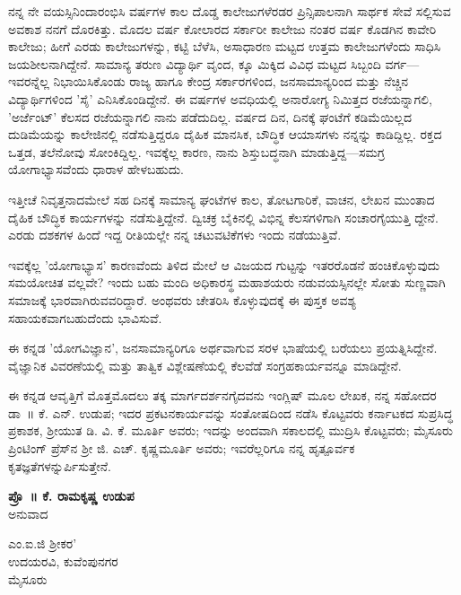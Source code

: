 ನನ್ನ  ನೇ ವಯಸ್ಸಿನಿಂದಾರಂಭಿಸಿ  ವರ್ಷಗಳ ಕಾಲ ದೊಡ್ಡ ಕಾಲೇಜುಗಳೆರಡರ ಪ್ರಿನ್ಸಿಪಾಲನಾಗಿ ಸಾರ್ಥಕ ಸೇವೆ ಸಲ್ಲಿಸುವ ಅವಕಾಶ ನನಗೆ ದೊರಕಿತ್ತು. ಮೊದಲ  ವರ್ಷ ಕೋಲಾರದ ಸರ್ಕಾರೀ ಕಾಲೇಜು ನಂತರ  ವರ್ಷ ಕೊಡಗಿನ ಕಾವೇರಿ ಕಾಲೇಜು; ಹೀಗೆ ಎರಡು ಕಾಲೇಜುಗಳನ್ನು, ಕಟ್ಟಿ ಬೆಳೆಸಿ, ಅಸಾಧಾರಣ ಮಟ್ಟದ ಉತ್ತಮ ಕಾಲೇಜುಗಳೆಂದು ಸಾಧಿಸಿ ಜಯಶೀಲನಾಗಿದ್ದೇನೆ. ಸಾಮಾನ್ಯ  ತರುಣ ವಿದ್ಯಾರ್ಥಿ ವೃಂದ,  ಕ್ಕೂ ಮಿಕ್ಕಿದ ವಿವಿಧ ಮಟ್ಟದ ಸಿಬ್ಬಂದಿ ವರ್ಗ—ಇವರನ್ನೆಲ್ಲ ನಿಭಾಯಿಸಿಕೊಂಡು ರಾಜ್ಯ ಹಾಗೂ ಕೇಂದ್ರ ಸರ್ಕಾರಗಳಿಂದ, ಜನಸಾಮಾನ್ಯರಿಂದ ಮತ್ತು ನೆಚ್ಚಿನ ವಿದ್ಯಾರ್ಥಿಗಳಿಂದ 'ಸೈ' ಎನಿಸಿಕೊಂಡಿದ್ದೇನೆ. ಈ  ವರ್ಷಗಳ ಅವಧಿಯಲ್ಲಿ ಅನಾರೋಗ್ಯ ನಿಮಿತ್ತದ ರಜೆಯನ್ನಾಗಲಿ, 'ಅರ್ಜೆಂಟ್​' ಕೆಲಸದ ರಜೆಯನ್ನಾಗಲಿ ನಾನು ಪಡೆದುದಿಲ್ಲ. ವರ್ಷದ  ದಿನ, ದಿನಕ್ಕೆ  ಘಂಟೆಗೆ ಕಡಿಮೆಯಿಲ್ಲದ ದುಡಿಮೆಯನ್ನು ಕಾಲೇಜಿನಲ್ಲಿ ನಡೆಸುತ್ತಿದ್ದರೂ ದೈಹಿಕ ಮಾನಸಿಕ, ಬೌದ್ಧಿಕ ಆಯಾಸಗಳು ನನ್ನನ್ನು ಕಾಡಿದ್ದಿಲ್ಲ. ರಕ್ತದ ಒತ್ತಡ, ತಲೆನೋವು ಸೋಂಕಿದ್ದಿಲ್ಲ. ಇವಕ್ಕೆಲ್ಲ ಕಾರಣ, ನಾನು ಶಿಸ್ತುಬದ್ಧನಾಗಿ ಮಾಡುತ್ತಿದ್ದ—ಸಮಗ್ರ ಯೋಗಾಭ್ಯಾಸವೆಂದು ಧಾರಾಳ ಹೇಳಬಹುದು.

ಇತ್ತೀಚೆ ನಿವೃತ್ತನಾದಮೇಲೆ ಸಹ ದಿನಕ್ಕೆ ಸಾಮಾನ್ಯ  ಘಂಟೆಗಳ ಕಾಲ, ತೋಟಗಾರಿಕೆ, ವಾಚನ, ಲೇಖನ ಮುಂತಾದ ದೈಹಿಕ ಬೌದ್ಧಿಕ ಕಾರ್ಯಗಳನ್ನು ನಡೆಸುತ್ತಿದ್ದೇನೆ. ದ್ವಿಚಕ್ರ ಬೈಕಿನಲ್ಲಿ ವಿಭಿನ್ನ ಕೆಲಸಗಳಿಗಾಗಿ ಸಂಚಾರಗೈಯುತ್ತಿ ದ್ದೇನೆ. ಎರಡು ದಶಕಗಳ ಹಿಂದೆ ಇದ್ದ ರೀತಿಯಲ್ಲೇ ನನ್ನ ಚಟುವಟಿಕೆಗಳು ಇಂದು ನಡೆಯುತ್ತಿವೆ.

ಇವಕ್ಕೆಲ್ಲ 'ಯೋಗಾಭ್ಯಾಸ' ಕಾರಣವೆಂದು ತಿಳಿದ ಮೇಲೆ ಆ ವಿಜಯದ ಗುಟ್ಟನ್ನು  ಇತರರೊಡನೆ ಹಂಚಿಕೊಳ್ಳುವುದು ಸಮಯೋಚಿತ ವಲ್ಲವೇ? ಇಂದು ಬಹು ಮಂದಿ ಅಧಿಕಾರಸ್ಥ ಮಹಾಶಯರು ನಡುವಯಸ್ಸಿನಲ್ಲೇ ಸೋತು ಸುಣ್ಣವಾಗಿ ಸಮಾಜಕ್ಕೆ ಭಾರವಾಗಿರುವವರಿದ್ದಾರೆ. ಅಂಥವರು ಚೇತರಿಸಿ ಕೊಳ್ಳುವುದಕ್ಕೆ ಈ ಪುಸ್ತಕ ಅವಶ್ಯ ಸಹಾಯಕವಾಗಬಹುದೆಂದು ಭಾವಿಸುವೆ.

ಈ ಕನ್ನಡ 'ಯೋಗವಿಜ್ಞಾನ', ಜನಸಾಮಾನ್ಯರಿಗೂ ಅರ್ಥವಾಗುವ ಸರಳ ಭಾಷೆಯಲ್ಲಿ ಬರೆಯಲು ಪ್ರಯತ್ನಿಸಿದ್ದೇನೆ. ವೈಜ್ಞಾನಿಕ ವಿವರಣೆಯಲ್ಲಿ ಮತ್ತು ತಾತ್ವಿಕ ವಿಶ್ಲೇಷಣೆಯಲ್ಲಿ ಕೆಲವೆಡೆ ಸಂಗ್ರಹಕಾರ್ಯವನ್ನೂ ಮಾಡಿದ್ದೇನೆ.

ಈ ಕನ್ನಡ ಆವೃತ್ತಿಗೆ ಮೊತ್ತಮೊದಲು ತಕ್ಕ ಮಾರ್ಗದರ್ಶನಗೈದವನು ಇಂಗ್ಲಿಷ್ ಮೂಲ ಲೇಖಕ, ನನ್ನ ಸಹೋದರ ಡಾ~॥ ಕೆ. ಎನ್. ಉಡುಪ; ಇದರ ಪ್ರಕಟನಕಾರ್ಯವನ್ನು ಸಂತೋಷದಿಂದ ನಡೆಸಿ ಕೊಟ್ಟವರು ಕರ್ನಾಟಕದ ಸುಪ್ರಸಿದ್ಧ ಪ್ರಕಾಶಕ, ಶ‍್ರೀಯುತ ಡಿ. ವಿ. ಕೆ. ಮೂರ್ತಿ ಅವರು; ಇದನ್ನು ಅಂದವಾಗಿ ಸಕಾಲದಲ್ಲಿ ಮುದ್ರಿಸಿ ಕೊಟ್ಟವರು; ಮೈಸೂರು ಪ್ರಿಂಟಿಂಗ್ ಪ್ರೆಸ್​ನ ಶ‍್ರೀ ಜಿ. ಎಚ್. ಕೃಷ್ಣಮೂರ್ತಿ ಅವರು; ಇವರೆಲ್ಲರಿಗೂ ನನ್ನ ಹೃತ್ಪೂರ್ವಕ ಕೃತಜ್ಞತೆಗಳನ್ನುರ್ಪಿಸುತ್ತೇನೆ.

\begin{flushright}
\textbf{ಪ್ರೊ~॥ ಕೆ. ರಾಮಕೃಷ್ಣ ಉಡುಪ}\\ಅನುವಾದ
\end{flushright}

ಎಂ.ಐ.ಜಿ  ಶ‍್ರೀಕರ'\\ಉದಯರವಿ, ಕುವೆಂಪುನಗರ\\ಮೈಸೂರು 

